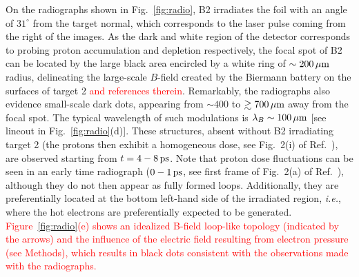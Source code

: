 \documentclass[aps,twocolumn,showpacs,superscriptaddress]{revtex4}
\begin{document}
On the radiographs shown in Fig.~\ref{fig:radio}, B2 irradiates the foil with an angle of $31^\circ$ from the target normal, which corresponds to the laser pulse coming from the right of the images. 
As the dark and white region of the detector corresponds to probing proton accumulation and depletion respectively, 
the focal spot of B2 can be located by the large black area encircled by a white ring of $\sim 200\,\rm \mu m$ radius, delineating the large-scale $B$-field created by the Biermann battery on the surfaces of target 2 \cite{RSI_Albertazzi_2015} \textcolor{red}{and references therein}. Remarkably, the radiographs also evidence small-scale dark dots, appearing from $\sim 400$ to $\gtrsim 700\,\rm \mu m$ away from the focal spot. The typical wavelength of such modulations is $\lambda_B \sim 100\,\rm \mu m$ [see lineout in Fig.~\ref{fig:radio}(d)].
These structures, absent without B2 irradiating target 2 (the protons then exhibit a homogeneous dose, see Fig.~2(i) of Ref.~\cite{RSI_Albertazzi_2015}), are observed starting from $t=4-8\,\rm ps$. Note that proton dose fluctuations can be seen in an early time radiograph ($0-1\,\rm ps$, see first frame of Fig.~2(a) of Ref.~\cite{RSI_Albertazzi_2015}), although they do not then appear as fully formed loops. Additionally, they are preferentially located at the bottom left-hand side of the irradiated region, \emph{i.e.}, where the hot electrons are preferentially expected to be generated.
\textcolor{red}{Figure~\ref{fig:radio}(e) shows an idealized B-field loop-like topology (indicated by the arrows) and the influence of the electric field resulting from electron pressure (see Methods),
which results in black dots  consistent with the observations made with the radiographs.}  
\end{document}
